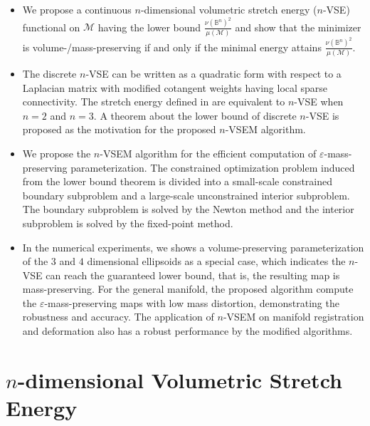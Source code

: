\documentclass{article}
\begin{document}
\begin{itemize}
    \item We propose a continuous $n$-dimensional volumetric stretch energy ($n$-VSE) functional on $\mathcal{M}$ having the lower bound $\frac{\nu(\mathbb{B}^n)^2}{\mu(\mathcal{M})}$ and show that the minimizer is volume-/mass-preserving if and only if the minimal energy attains $\frac{\nu(\mathbb{B}^n)^2}{\mu(\mathcal{M})}$.

    \item The discrete $n$-VSE can be written as a quadratic form with respect to a Laplacian matrix with modified cotangent weights having local sparse connectivity. The stretch energy defined in \cite{MHWW19,MHTL19,MHTL20,TMWH23} are equivalent to $n$-VSE when $n = 2$ and $n = 3$. A theorem about the lower bound of discrete $n$-VSE is proposed as the motivation for the proposed $n$-VSEM algorithm.

    \item We propose the $n$-VSEM algorithm for the efficient computation of $\varepsilon$-mass-preserving parameterization. The constrained optimization problem induced from the lower bound theorem is divided into a small-scale constrained boundary subproblem and a large-scale unconstrained interior subproblem. The boundary subproblem is solved by the Newton method and the interior subproblem is solved by the fixed-point method.

    \item In the numerical experiments, we shows a volume-preserving parameterization of the $3$ and $4$ dimensional ellipsoids as a special case, which indicates the $n$-VSE can reach the guaranteed lower bound, that is, the resulting map is mass-preserving. For the general manifold, the proposed algorithm compute the $\varepsilon$-mass-preserving maps with low mass distortion, demonstrating the robustness and accuracy. The application of $n$-VSEM on manifold registration and deformation also has a robust performance by the modified algorithms.

\end{itemize}


\section{$n$-dimensional Volumetric Stretch Energy}
\end{document}
